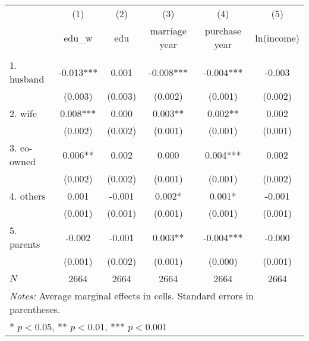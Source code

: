
\begin{tabular}{l*{5}{c}}
    \hline\hline
                &\multicolumn{1}{c}{(1)}&\multicolumn{1}{c}{(2)}&\multicolumn{1}{c}{(3)}&\multicolumn{1}{c}{(4)}&\multicolumn{1}{c}{(5)}\\
                &\multicolumn{1}{c}{edu\_w} &\multicolumn{1}{c}{edu} &\multicolumn{1}{c}{marriage year} &\multicolumn{1}{c}{purchase year} &\multicolumn{1}{c}{ln(income)} \\
    \hline
            &                     &                     &                     &                     &                     \\
    1. husband  &      -0.013{***}&       0.001         &      -0.008{***}&      -0.004{***}&      -0.003         \\
                &     (0.003)         &     (0.003)         &     (0.002)         &     (0.001)         &     (0.002)         \\
    [1em]
    2. wife  &       0.008{***}&       0.000         &       0.003{**} &       0.002{**} &       0.002         \\
                &     (0.002)         &     (0.002)         &     (0.001)         &     (0.001)         &     (0.001)         \\
    [1em]
    3. co-owned  &       0.006{**} &       0.002         &       0.000         &       0.004{***}&       0.002         \\
                &     (0.002)         &     (0.002)         &     (0.001)         &     (0.001)         &     (0.002)         \\
    [1em]
    4. others  &       0.001         &      -0.001         &       0.002{*}  &       0.001{*}  &      -0.001         \\
                &     (0.001)         &     (0.001)         &     (0.001)         &     (0.001)         &     (0.001)         \\
    [1em]
    5. parents  &      -0.002         &      -0.001         &       0.003{**} &      -0.004{***}&      -0.000         \\
                &     (0.001)         &     (0.002)         &     (0.001)         &     (0.000)         &     (0.001)         \\
    \hline
    \(N\)       &        2664         &        2664         &        2664         &        2664         &        2664         \\
    \hline\hline
    \multicolumn{6}{l}{\footnotesize \textit{Notes:} Average marginal effects in cells. Standard errors in parentheses. }\\
    \multicolumn{6}{l}{\footnotesize {*} \(p<0.05\), {**} \(p<0.01\), {***} \(p<0.001\)}\\
    \end{tabular}
    